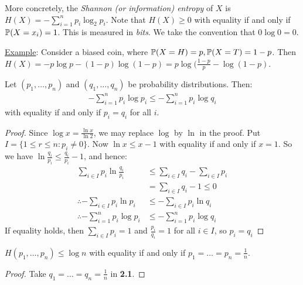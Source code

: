 \documentclass[10pt,a4paper]{article}
\begin{document}
More concretely, the \emph{Shannon (or information) entropy} of $X$ is $H(X) = -\sum_{i=1}^n p_i \log_2 p_i$. Note that $H(X) \geq 0$ with equality if and only if $\P(X=x_i) = 1$. This is measured in \emph{bits}. We take the convention that $0\log 0 =0$.

\hspace*{-1em}\underline{Example}: Consider a biased coin, where $\P(X=H) = p, \P(X=T) = 1-p$. Then $H(X) = -p\log p-(1-p)\log(1-p) = p\log(\frac{1-p}{p} - \log(1-p)$.

\begin{figure}[H]
\centering
{}
\end{figure}

\begin{proposition}
Let $(p_1, \ldots, p_n)$ and $(q_1, \ldots, q_n)$ be probability distributions. Then:
\begin{align*}
-\sum_{i=1}^n p_i \log p_i \leq -\sum_{i=1}^n p_i \log q_i
\end{align*}
with equality if and only if $p_i = q_i$ for all $i$.
\end{proposition}

\begin{proof}
Since $\log x = \frac{\ln x}{\ln 2}$, we may replace $\log$ by $\ln$ in the proof. Put $I = \{1 \leq r\leq n: p_i \neq 0\}$. Now $\ln x \leq x-1$ with equality if and only if $x=1$. So we have $\ln \frac{q_i}{p_i} \leq \frac{q_i}{p_i} - 1$, and hence:
\begin{align*}
\sum_{i \in I} p_i \ln \frac{q_i}{p_i} &\leq \sum_{i\in I}q_i - \sum_{i \in I}p_i\\
&= \sum_{i \in I} q_i - 1 \leq 0\\
\therefore - \sum_{i \in I}p_i \ln p_i &\leq - \sum_{i \in I} p_i \ln q_i\\
\therefore -\sum_{i=1}^n p_i \log p_i &\leq -\sum_{i=1}^n p_i \log q_i
\end{align*}
If equality holds, then $\sum_{i\in I} p_i =1$ and $\frac{p_i}{q_i} = 1$ for all $i \in I$, so $p_i = q_i$
\end{proof}

\begin{corollary}
$H(p_1, \ldots, p_n) \leq \log n$ with equality if and only if $p_1 = \ldots = p_n = \frac1n$.
\end{corollary}
\begin{proof}
Take $q_1 = \ldots = q_n = \frac1n$ in \textbf{2.1}.
\end{proof}
\end{document}
